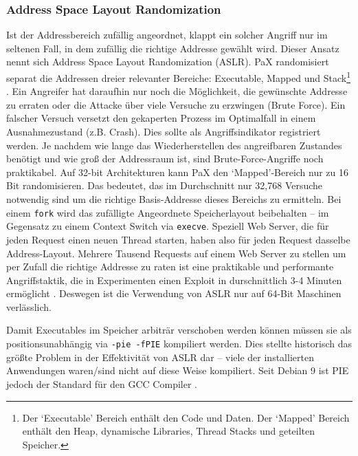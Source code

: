 \subsubsection{Address Space Layout Randomization}
\label{sec:aslr}

Ist der Addressbereich zufällig angeordnet, klappt ein solcher Angriff nur im seltenen Fall, in dem zufällig die richtige Addresse gewählt wird. Dieser Ansatz nennt sich Address Space Layout Randomization (ASLR). PaX randomisiert separat die Addressen dreier relevanter Bereiche: Executable, Mapped und Stack\footnote{Der `Executable' Bereich  enthält den
Code und Daten. Der `Mapped' Bereich enthält den Heap, dynamische Libraries, Thread Stacks und geteilten Speicher.} \cite{pax-aslr}.
Ein Angreifer hat daraufhin nur noch die Möglichkeit, die gewünschte Addresse zu erraten oder die Attacke über viele Versuche zu erzwingen (Brute Force). Ein falscher Versuch versetzt den gekaperten Prozess im Optimalfall in einem Ausnahmezustand (z.B. Crash). Dies sollte als Angriffsindikator registriert werden. Je nachdem wie lange das Wiederherstellen des
angreifbaren Zustandes benötigt und wie groß der Addressraum ist, sind Brute-Force-Angriffe noch praktikabel. Auf 32-bit Architekturen kann PaX den `Mapped'-Bereich nur zu 16 Bit randomisieren. Das bedeutet, das im Durchschnitt nur 32,768 Versuche notwendig sind um die richtige Basis-Addresse dieses Bereichs zu ermitteln. Bei einem \texttt{fork} wird das zufälligte Angeordnete Speicherlayout beibehalten -- im Gegensatz zu einem Context Switch via \texttt{execve}. Speziell Web Server,
die für jeden Request einen neuen Thread starten, haben also für jeden Request dasselbe Address-Layout. Mehrere Tausend Requests auf einem Web Server zu stellen um per Zufall die richtige Addresse zu raten ist eine praktikable und performante Angriffstaktik, die in Experimenten einen Exploit in durschnittlich 3-4 Minuten ermöglicht \cite{shacham_2004}.
Deswegen ist die Verwendung von ASLR nur auf 64-Bit Maschinen verlässlich.

Damit Executables im Speicher arbiträr verschoben werden können müssen sie als positionsunabhängig via \texttt{-pie -fPIE} kompiliert werden. Dies stellte historisch das größte Problem in der Effektivität von ASLR dar -- viele der installierten Anwendungen waren/sind nicht auf diese Weise kompiliert. Seit Debian 9 ist PIE jedoch der Standard für den GCC Compiler \cite{debian-9}.

